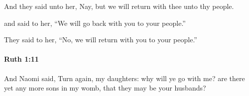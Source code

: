 			\begin{versebox}
					\item[BHS] 
					\item[LXX] 
					\item[ASV] And they said unto her, Nay, but we will return with thee unto thy people.
					\item[NIV] and said to her, “We will go back with you to your people.”
					\item[NRSV] They said to her, “No, we will return with you to your people.”
			\end{versebox}

		\paragraph{Ruth 1:11} %
			\label{RUTH-1-11}

			And Naomi said, Turn again, my daughters: why will ye go with me? are there yet any more sons in my womb, that they may be your husbands?

